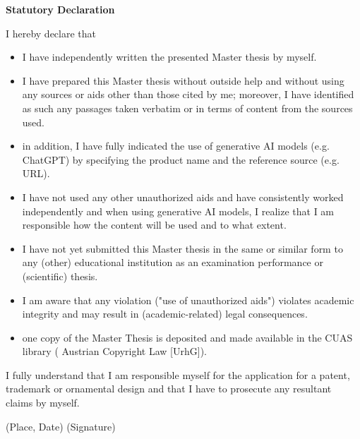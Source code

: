 %
%
%
%

{\Large \textbf{ Statutory Declaration}}

\vspace{1cm}

I hereby declare that
%
\begin{itemize}
\item 	I have independently written the presented Master thesis by myself.
\item	I have prepared this Master thesis without outside help and without using any sources or aids other than those cited by me; moreover, I have identified as such any passages taken verbatim or in terms of content from the sources used.
\item	in addition, I have fully indicated the use of generative AI models (e.g. ChatGPT) by specifying the product name and the reference source (e.g. URL).
\item   I have not used any other unauthorized aids and have consistently worked independently and when using generative AI models, I realize that I am responsible how the content will be used and to what extent.
\item   I have not yet submitted this Master thesis in the same or similar form to any (other) educational institution as an examination performance or (scientific) thesis.
\item   I am aware that any violation ("use of unauthorized aids") violates academic integrity and may result in (academic-related) legal consequences.
\item	one copy of the Master Thesis is deposited and made available in the CUAS
	library ( Austrian Copyright Law [UrhG]).
\end{itemize} 
%
I fully understand that I am responsible myself for the application for a patent,
trademark or ornamental design and that I have to prosecute any resultant
claims by myself.

\vspace{3cm}

\hrulefill 

(Place, Date) \hfill (Signature)
